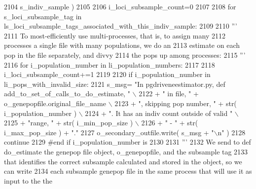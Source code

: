 \begin{DoxyCode}
2104                                                                     s\_indiv\_sample )
2105     
2106         i\_loci\_subsample\_count=0
2107 
2108         \textcolor{keywordflow}{for} s\_loci\_subsample\_tag \textcolor{keywordflow}{in} ls\_loci\_subsample\_tags\_associated\_with\_this\_indiv\_sample:
2109 
2110             \textcolor{stringliteral}{'''}
2111 \textcolor{stringliteral}{            To most-efficiently use multi-processes, that is, to assign many}
2112 \textcolor{stringliteral}{            processes a single file with many populations, we do an}
2113 \textcolor{stringliteral}{            estimate on each pop in the file separately, and divvy}
2114 \textcolor{stringliteral}{            the pops up among processes:}
2115 \textcolor{stringliteral}{            '''}
2116             \textcolor{keywordflow}{for} i\_population\_number \textcolor{keywordflow}{in} li\_population\_numbers:
2117 
2118                 i\_loci\_subsample\_count+=1
2119 
2120                 \textcolor{keywordflow}{if} i\_population\_number \textcolor{keywordflow}{in} li\_pops\_with\_invalid\_size:
2121                     s\_msg= \textcolor{stringliteral}{"In pgdriveneestimator.py, def add\_to\_set\_of\_calls\_to\_do\_estimate, "} \(\backslash\)
2122                                     + \textcolor{stringliteral}{" in file, "} + o\_genepopfile.original\_file\_name \(\backslash\)
2123                                     + \textcolor{stringliteral}{", skipping pop number, "}  + str( i\_population\_number ) \(\backslash\)
2124                                     + \textcolor{stringliteral}{".  It has an indiv count outside of valid "} \(\backslash\)
2125                                     + \textcolor{stringliteral}{"range, "} + str( i\_min\_pop\_size ) \(\backslash\)
2126                                     + \textcolor{stringliteral}{" - "} + str( i\_max\_pop\_size ) + \textcolor{stringliteral}{"."}
2127                     o\_secondary\_outfile.write( s\_msg + \textcolor{stringliteral}{"\(\backslash\)n"} )
2128                     \textcolor{keywordflow}{continue}
2129                 \textcolor{comment}{#end if i\_population\_number is}
2130 
2131                 \textcolor{stringliteral}{'''}
2132 \textcolor{stringliteral}{                We send to def do\_estimate the genepop file object, o\_genepopfile, and the subsample tag}
2133 \textcolor{stringliteral}{                that identifies the correct subsample calculated and stored in the object, so we can write}
2134 \textcolor{stringliteral}{                each subsample genepop file in the same process that will use it as input to the the
}
\end{DoxyCode}
